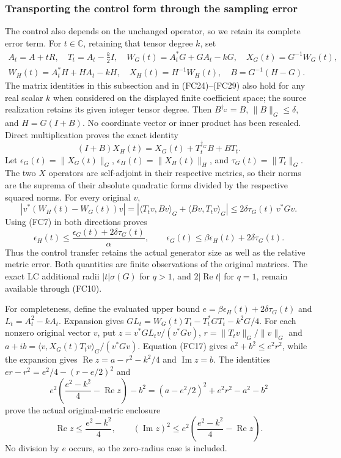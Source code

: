 \subsubsection{Transporting the control form through the sampling error}

The control also depends on the unchanged operator, so we retain its
complete error term. For $t\in\mathbb C$, retaining that tensor degree
$k$, set
\[
\begin{gathered}
 A_t=A+tR,\quad T_t=A_t-\tfrac k2I,\quad
 W_G(t)=A_t^*G+GA_t-kG,\quad X_G(t)=G^{-1}W_G(t),\\
 W_H(t)=A_t^*H+HA_t-kH,\quad X_H(t)=H^{-1}W_H(t),\quad
 B=G^{-1}(H-G).
\end{gathered}\tag{FC14}
\]
The matrix identities in this subsection and in (FC24)--(FC29)
also hold for any real scalar $k$ when considered on the displayed
finite coefficient space; the source realization retains its given
integer tensor degree.
Then $B^{\dagger_G}=B$, $\|B\|_G\le\delta$, and $H=G(I+B)$.
No coordinate vector or inner product has been rescaled. Direct
multiplication proves the exact identity
\[
 (I+B)X_H(t)=X_G(t)+T_t^{\dagger_G}B+BT_t.
 \tag{FC15}
\]
Let $\epsilon_G(t)=\|X_G(t)\|_G$, $\epsilon_H(t)=\|X_H(t)\|_H$,
and $\tau_G(t)=\|T_t\|_G$. The two $X$ operators are self-adjoint
in their respective metrics, so their norms are the suprema of their
absolute quadratic forms divided by the respective squared norms.
For every original $v$,
\[
 |v^*(W_H(t)-W_G(t))v|
 =|\langle T_tv,Bv\rangle_G+\langle Bv,T_tv\rangle_G|
 \le2\delta\tau_G(t)\,v^*Gv.
 \tag{FC16}
\]
Using (FC7) in both directions proves
\[
 \boxed{\epsilon_H(t)\le
  \frac{\epsilon_G(t)+2\delta\tau_G(t)}{\alpha},\qquad
 \epsilon_G(t)\le\beta\epsilon_H(t)+2\delta\tau_G(t).}
 \tag{FC17}
\]
Thus the control transfer retains the actual generator size as well as
the relative metric error. Both quantities are finite observations of
the original matrices. The exact LC additional radii
$|t|\sigma(G)$ for $q>1$, and $2|\operatorname{Re}t|$ for $q=1$,
remain available through (FC10).

For completeness, define the evaluated upper bound
$e=\beta\epsilon_H(t)+2\delta\tau_G(t)$ and $L_t=A_t^2-kA_t$.
Expansion gives $GL_t=W_G(t)T_t-T_t^*GT_t-k^2G/4$.
For each nonzero original vector $v$, put
$z=v^*GL_tv/(v^*Gv)$, $r=\|T_tv\|_G/\|v\|_G$ and
$a+ib=\langle v,X_G(t)T_tv\rangle_G/(v^*Gv)$.
Equation (FC17) gives $a^2+b^2\le e^2r^2$, while the expansion gives
$\operatorname{Re}z=a-r^2-k^2/4$ and $\operatorname{Im}z=b$.
The identities $er-r^2=e^2/4-(r-e/2)^2$ and
\[
 e^2\left(\frac{e^2-k^2}{4}-\operatorname{Re}z\right)-b^2
 =(a-e^2/2)^2+e^2r^2-a^2-b^2
\]
prove the actual original-metric enclosure
\[
 \operatorname{Re}z\le\frac{e^2-k^2}{4},\qquad
 (\operatorname{Im}z)^2\le e^2
       \left(\frac{e^2-k^2}{4}-\operatorname{Re}z\right).
 \tag{FC18}
\]
No division by $e$ occurs, so the zero-radius case is included.


